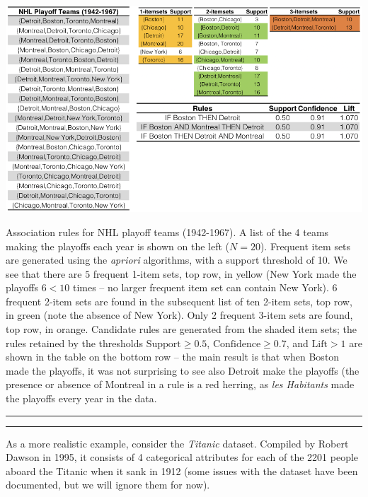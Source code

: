 \begin{table}[!t]
\centering
\includegraphics[width=\textwidth]{images/DSML/NHL.png}
\caption[\small Frequent item sets for NHL playoff teams.]{\small Association rules for NHL playoff teams (1942-1967). A list of the 4 teams making the playoffs each year is shown on the left ($N=20$). Frequent item sets are generated using the \textit{apriori} algorithms, with a support threshold of 10. We see that there are $5$ frequent 1-item sets, top row, in yellow (New York made the playoffs $6<10$ times -- no larger frequent item set can contain New York). 6 frequent 2-item sets are found in the subsequent list of ten 2-item sets, top row, in green (note the absence of New York). Only 2 frequent 3-item sets are found, top row, in orange. Candidate rules are generated from the shaded item sets; the rules retained by the thresholds $\textrm{Support}\geq 0.5$, $\textrm{Confidence}\geq 0.7$, and $\textrm{Lift}>1$ are shown in the table on the bottom row -- the main result is that when Boston made the playoffs, it was not surprising to see also Detroit make the playoffs (the presence or absence of Montreal in a rule is a red herring, as \textit{les Habitants} made the playoffs every year in the data.} \label{tab:NHL}\hrule
\end{table}
\begin{center}
    \rule{0.5\textwidth}{.4pt}
\end{center} 
As a more realistic example, consider the \textit{Titanic} dataset. Compiled by Robert Dawson in 1995, it consists of 4 categorical attributes for each of the 2201 people aboard the Titanic when it sank in 1912 (some issues with the dataset have been documented, but we will ignore them for now).  
